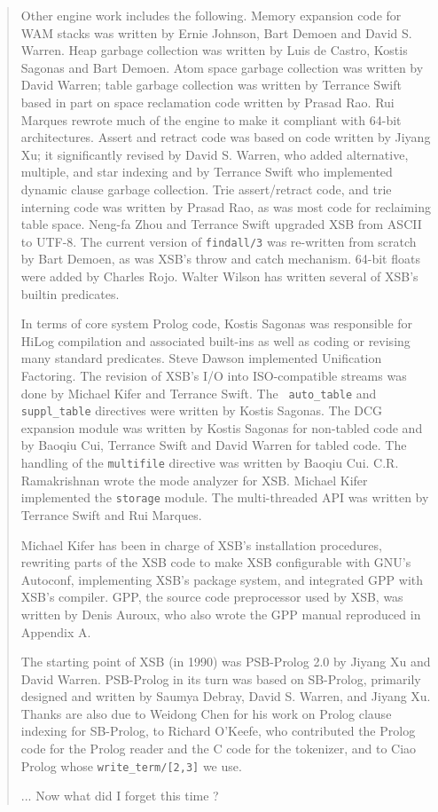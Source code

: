 \begin{quote}
Other engine work includes the following.  Memory expansion code for
WAM stacks was written by Ernie Johnson, Bart Demoen and David
S. Warren.  Heap garbage collection was written by Luis de Castro,
Kostis Sagonas and Bart Demoen.  Atom space garbage collection was
written by David Warren; table garbage collection was written by
Terrance Swift based in part on space reclamation code written by
Prasad Rao.  Rui Marques rewrote much of the engine to make it
compliant with 64-bit architectures.  Assert and retract code was
based on code written by Jiyang Xu; it significantly revised by David
S. Warren, who added alternative, multiple, and star indexing and by
Terrance Swift who implemented dynamic clause garbage collection. Trie
assert/retract code, and trie interning code was written by Prasad
Rao, as was most code for reclaiming table space. Neng-fa Zhou and
Terrance Swift upgraded XSB from ASCII to UTF-8.  The current version
of {\tt findall/3} was re-written from scratch by Bart Demoen, as was
XSB's throw and catch mechanism.  64-bit floats were added by Charles
Rojo.  Walter Wilson has written several of XSB's builtin predicates.

In terms of core system Prolog code, Kostis Sagonas was responsible
for HiLog compilation and associated built-ins as well as coding or
revising many standard predicates.  Steve Dawson implemented
Unification Factoring.  The revision of XSB's I/O into ISO-compatible
streams was done by Michael Kifer and Terrance Swift.  The {\tt
  auto\_table} and {\tt suppl\_table} directives were written by
Kostis Sagonas.  The DCG expansion module was written by Kostis
Sagonas for non-tabled code and by Baoqiu Cui, Terrance Swift and
David Warren for tabled code.  The handling of the {\tt multifile}
directive was written by Baoqiu Cui. C.R. Ramakrishnan wrote the mode
analyzer for XSB.  Michael Kifer implemented the {\tt storage} module.
The multi-threaded API was written by Terrance Swift and Rui Marques.

Michael Kifer has been in charge of XSB's installation procedures,
rewriting parts of the XSB code to make XSB configurable with GNU's
Autoconf, implementing XSB's package system, and integrated GPP with
XSB's compiler.  GPP, the source code preprocessor used by XSB, was
written by Denis Auroux, who also wrote the GPP manual reproduced in
Appendix A.

The starting point of XSB (in 1990) was PSB-Prolog 2.0 by Jiyang Xu
and David Warren.  PSB-Prolog in its turn was based on SB-Prolog,
primarily designed and written by Saumya Debray, David S. Warren, and
Jiyang Xu.  Thanks are also due to Weidong Chen for his work on Prolog
clause indexing for SB-Prolog, to Richard O'Keefe, who contributed the
Prolog code for the Prolog reader and the C code for the tokenizer,
and to Ciao Prolog whose {\tt write\_term/[2,3]} we use.

... Now what did I forget this time ?

\end{quote}

